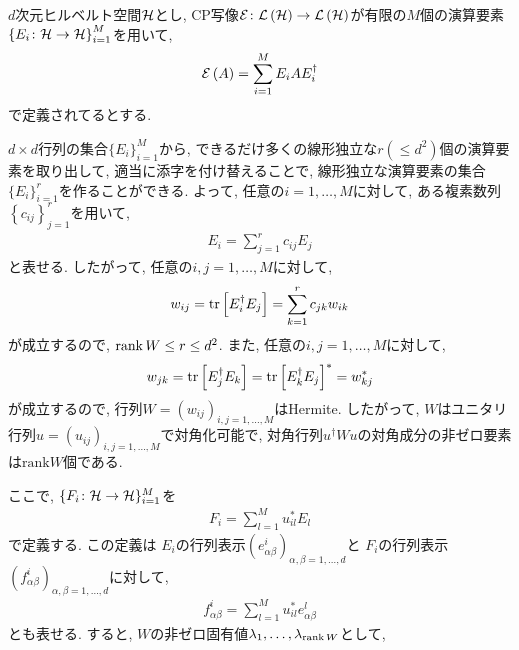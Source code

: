 \begin{ex}
    \label{ex8.10}
    $d$次元ヒルベルト空間$\mathcal{H}$とし, CP写像$\mathcal{E} \colon \mathcal{L}\left({\mathcal{H}}\right) \to \mathcal{L}\left({\mathcal{H}}\right)$が有限の$M$個の演算要素$\left\{ E_i \colon \mathcal{H} \to \mathcal{H} \right\}_{i = 1}^{M}$を用いて,
    \begin{align*}
        \mathcal{E} \left( A\right) = \sum_{i=1}^M E_i A E_i^\dagger
    \end{align*}
    で定義されてるとする.
    \par
    $d \times d$行列の集合$\{E_i\}_{i=1}^{M}$から, できるだけ多くの線形独立な$r \left(\le d^2\right)$個の演算要素を取り出して, 適当に添字を付け替えることで, 線形独立な演算要素の集合$\{E_i\}_{i=1}^{r}$を作ることができる.
    よって, 任意の$i= 1, \dots , M$に対して, ある複素数列$\left\{ c_{ij} \right\}_{j=1}^{r}$を用いて,
    \begin{align*}
        E_i = \sum_{j=1}^{r} c_{ij} E_j
    \end{align*}
    と表せる.
    したがって, 任意の$i, j = 1 , \dots, M$に対して,
    \begin{align*}
        w_{ij} = \mathrm{tr}\left[E_i^\dagger E_j\right] = \sum_{k=1}^{r} c_{jk} w_{ik}
    \end{align*}
    が成立するので, $\operatorname{rank} W \leq r \leq d^2$.
    また, 任意の$i, j = 1 , \dots, M$に対して,
    \begin{align*}
        w_{jk} = \mathrm{tr}\left[ E_j^\dagger E_k\right]= \mathrm{tr}\left[ E_k^\dagger E_j\right]^*
        = w_{kj}^*
    \end{align*}
    が成立するので, 行列$W = \left(w_{ij}\right)_{i,j = 1, \dots , M}$はHermite.  したがって, $W$はユニタリ行列$u = \left(u_{ij}\right)_{i,j = 1, \dots , M}$で対角化可能で, 対角行列$u^\dagger W u$の対角成分の非ゼロ要素は$\mathrm{rank}W$個である.
    \par
    ここで, $\{F_i \colon \mathcal{H} \to \mathcal{H} \}_{i=1}^{M}$を
    \begin{align*}
        F_i = \sum_{l=1}^{M} u_{il}^{*} E_l
    \end{align*}
    で定義する. この定義は
    $E_{i}$の行列表示$\left( e^{i}_{\alpha \beta} \right)_{\alpha, \beta=1,\dots,d}$と
    $F_{i}$の行列表示$\left( f^{i}_{\alpha \beta} \right)_{\alpha, \beta=1,\dots,d}$に対して,
    \begin{align*}
        f_{\alpha \beta}^{i} = \sum_{l = 1}^M u_{il}^* e^l_{\alpha \beta}
    \end{align*}
    とも表せる.
    すると, $W$の非ゼロ固有値$\lambda_1, \dots , \lambda_{\operatorname{rank} W}$として,

\end{ex}

